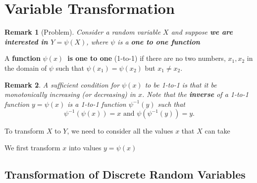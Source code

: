 \documentclass[smaller]{beamer}\usepackage[]{graphicx}\usepackage[]{color}
\newtheorem{remark}{Remark}[section]
\begin{document}
\section{Variable Transformation}

\begin{frame}{\secname}
  \begin{remark}[Problem]
  Consider a random variable $X$ and suppose \textbf{we are interested in $Y=\psi(X)$}, where $\psi $ is a \textbf{
  \textbf{one to one} function}
  \end{remark}
  \pause
  \begin{definition}
  A \textbf{function }$\psi \left( x\right) $\textbf{\ is one to one}
  (1-to-1) if there are no two numbers, $x_{1},x_{2}$ in the domain of $\psi $
  such that $\psi \left( x_{1}\right) =\psi \left( x_{2}\right) $ but $%
  x_{1}\neq x_{2}$.
  \end{definition}
  \pause
  \begin{remark}
  A sufficient condition for $\psi \left( x\right) $ to be 1-to-1 is
  that it be monotonically increasing (or decreasing) in $x$.
  \bigskip
  \pause
  Note that the \textbf{inverse} of a 1-to-1 function $y=\psi \left(
  x\right) $ is a 1-to-1 function $\psi^{-1}\left( y\right) $ such that
  \begin{equation*}
  \psi ^{-1}\left( \psi \left( x\right) \right) =x\text{ and }\psi \left( \psi
  ^{-1}\left( y\right) \right) =y.
  \end{equation*}
  \end{remark}

  To transform $X$ to $Y$, we need to consider all the values $x$ that $X$ can take

  We first transform $x$ into values $y=\psi (x)$

\end{frame}

\subsection{Transformation of Discrete Random Variables}
\end{document}
